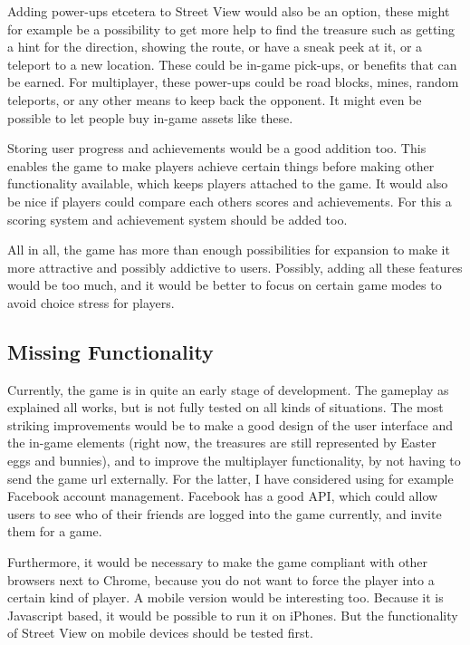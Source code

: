 \documentclass[a4paper,10pt]{article}
\begin{document}
Adding power-ups etcetera to Street View would also be an option, these might for example be a possibility to get more help to find the treasure such as  getting a hint for the direction, showing the route, or have a sneak peek at it, or a teleport to a new location. These could be in-game pick-ups, or benefits that can be earned. For multiplayer, these power-ups could be road blocks, mines, random teleports, or any other means to keep back the opponent. It might even be possible to let people buy in-game assets like these.

Storing user progress and achievements would be a good addition too. This enables the game to make players achieve certain things before making other functionality available, which keeps players attached to the game. It would also be nice if players could compare each others scores and achievements. For this a scoring system and achievement system should be added too.

All in all, the game has more than enough possibilities for expansion to make it more attractive and possibly addictive to users. Possibly, adding all these features would be too much, and it would be better to focus on certain game modes to avoid choice stress for players.

\subsection{Missing Functionality} %
\label{sub:missing_functionality}
Currently, the game is in quite an early stage of development. The gameplay as explained all works, but is not fully tested on all kinds of situations. The most striking improvements would be to make a good design of the user interface and the in-game elements (right now, the treasures are still represented by Easter eggs and bunnies), and to improve the multiplayer functionality, by not having to send the game url externally. For the latter, I have considered using for example Facebook account management. Facebook has a good API, which could allow users to see who of their friends are logged into the game currently, and invite them for a game.

Furthermore, it would be necessary to make the game compliant with other browsers next to Chrome, because you do not want to force the player into a certain kind of player. A mobile version would be interesting too. Because it is Javascript based, it would be possible to run it on iPhones. But the functionality of Street View on mobile devices should be tested first.
\end{document}
